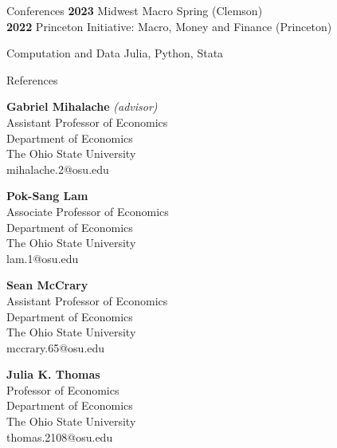 \documentclass{cv} %
\begin{document}
\begin{rSection}{Conferences}
{\bf 2023} Midwest Macro Spring (Clemson) \\
{\bf 2022} Princeton Initiative: Macro, Money and Finance (Princeton)
\end{rSection}
\bigskip


\begin{rSection}{Computation and Data}
Julia, Python, Stata
\end{rSection}
\bigskip

\begin{rSection}{References} 
\begin{minipage}{6cm}
	{\bf Gabriel Mihalache} \emph{(advisor)} \\
	Assistant Professor of Economics \\
	Department of Economics \\
	The Ohio State University \\
	mihalache.2@osu.edu
\end{minipage}
\begin{minipage}{6cm}
	{\bf Pok-Sang Lam} \\
	Associate Professor of Economics \\
	Department of Economics \\
	The Ohio State University \\
	lam.1@osu.edu
\end{minipage}
\begin{minipage}{6cm}
	{\bf Sean McCrary} \\
	Assistant Professor of Economics \\
	Department of Economics \\
	The Ohio State University \\
	mccrary.65@osu.edu
\end{minipage}

\bigskip
\begin{minipage}{6cm}
	{\bf Julia K. Thomas} \\
	Professor of Economics \\
	Department of Economics \\
	The Ohio State University \\
	thomas.2108@osu.edu
\end{minipage}

\end{rSection}
\end{document}
